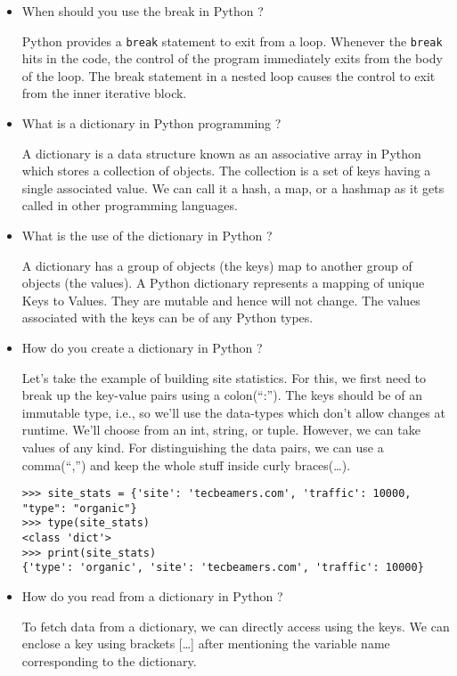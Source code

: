 \documentclass[11pt]{article}
\begin{document}
\begin{itemize}
\item When should you use the break in Python ? 

  Python provides a \verb;break; statement to exit from a loop. Whenever the \verb;break; hits in the code, the control of the program immediately exits from the body of the loop. The break statement in a nested loop causes the control to exit from the inner iterative block.

\item What is a dictionary in Python programming ?

  A dictionary is a data structure known as an associative array in Python which stores a collection of objects.
The collection is a set of keys having a single associated value. We can call it a hash, a map, or a hashmap as it gets called in other programming languages.

\item What is the use of the dictionary in Python ?
  
  A dictionary has a group of objects (the keys) map to another group of objects (the values). A Python dictionary represents a mapping of unique Keys to Values. They are mutable and hence will not change. The values associated with the keys can be of any Python types.

\item How do you create a dictionary in Python ?
  
  Let’s take the example of building site statistics. For this, we first need to break up the key-value pairs using a colon(“:”). The keys should be of an immutable type, i.e., so we’ll use the data-types which don’t allow changes at runtime. We’ll choose from an int, string, or tuple. However, we can take values of any kind. For distinguishing the data pairs, we can use a comma(“,”) and keep the whole stuff inside curly braces({…}).

\begin {verbatim}
>>> site_stats = {'site': 'tecbeamers.com', 'traffic': 10000, "type": "organic"}
>>> type(site_stats)
<class 'dict'>
>>> print(site_stats)
{'type': 'organic', 'site': 'tecbeamers.com', 'traffic': 10000}
\end{verbatim}

\item How do you read from a dictionary in Python ?
  
  To fetch data from a dictionary, we can directly access using the keys. We can enclose a key using brackets […] after mentioning the variable name corresponding to the dictionary.


\end{itemize}
\end{document}
